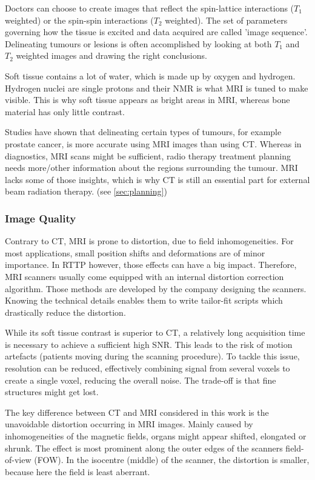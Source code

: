 Doctors can choose to create images that reflect the spin-lattice interactions ($T_1$ weighted) or the spin-spin interactions ($T_2$ weighted). 
The set of parameters governing how the tissue is excited and data acquired are called 'image sequence'.
Delineating tumours or lesions is often accomplished by looking at both $T_1$ and $T_2$ weighted images and drawing the right conclusions.

Soft tissue contains a lot of water, which is made up by oxygen and hydrogen.
Hydrogen nuclei are single protons and their NMR is what MRI is tuned to make visible.
This is why soft tissue appears as bright areas in MRI, whereas bone material has only little contrast. \cite{Currie2013}

Studies have shown that delineating certain types of tumours, for example prostate cancer, is more accurate using MRI images than using CT. \cite{Rasch1999, Debois1999a, Roach1996}
Whereas in diagnostics, MRI scans might be sufficient, radio therapy treatment planning needs more/other information about the regions surrounding the tumour.
MRI lacks some of those insights, which is why CT is still an essential part for external beam radiation therapy. (see \ref{sec:planning})


\subsubsection{Image Quality}
Contrary to CT, MRI is prone to distortion, due to field inhomogeneities.
For most applications, small position shifts and deformations are of minor importance.
In RTTP however, those effects can have a big impact.
Therefore, MRI scanners usually come equipped with an internal distortion correction algorithm.
Those methods are developed by the company designing the scanners.
Knowing the technical details enables them to write tailor-fit scripts which drastically reduce the distortion.

While its soft tissue contrast is superior to CT, a relatively long acquisition time is necessary to achieve a sufficient high SNR.
This leads to the risk of motion artefacts (patients moving during the scanning procedure).
To tackle this issue, resolution can be reduced, effectively combining signal from several voxels to create a single voxel, reducing the overall noise.
The trade-off is that fine structures might get lost.

The key difference between CT and MRI considered in this work is the unavoidable distortion occurring in MRI images.
Mainly caused by inhomogeneities of the magnetic fields, organs might appear shifted, elongated or shrunk.
The effect is most prominent along the outer edges of the scanners field-of-view (FOW).
In the isocentre (middle) of the scanner, the distortion is smaller, because here the field is least aberrant.


